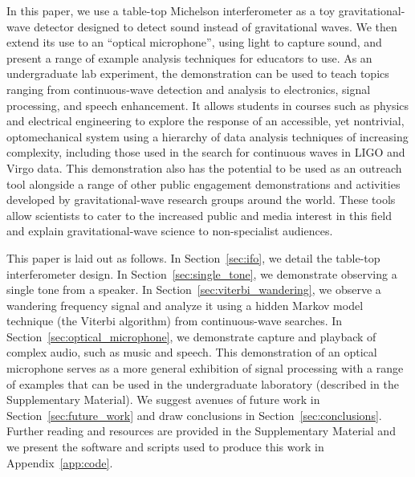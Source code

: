 \documentclass[paper-main.tex]{subfiles}
\begin{document}
In this paper, we use a table-top Michelson interferometer as a toy gravitational-wave detector designed to detect sound instead of gravitational waves. 
We then extend its use to an ``optical microphone'', using light to capture sound, and present a range of example analysis techniques for educators to use. 
As an undergraduate lab experiment, the demonstration can be used to teach topics ranging from continuous-wave detection and analysis to electronics, signal processing, and speech enhancement.
It allows students in courses such as physics and electrical engineering to explore the response of an accessible, yet nontrivial, optomechanical system using a hierarchy of data analysis techniques of increasing complexity, including those used in the search for continuous waves in LIGO and Virgo data.\cite{SuvorovaEtAl:2017, ScoX1O2Viterbi:2019} 
This demonstration also has the potential to be used as an outreach tool alongside a range of other public engagement demonstrations and activities developed by gravitational-wave research groups around the world. 
These tools allow scientists to cater to the increased public and media interest in this field and explain gravitational-wave science to non-specialist audiences.


This paper is laid out as follows. 
In Section~\ref{sec:ifo}, we detail the table-top interferometer design. 
In Section~\ref{sec:single_tone}, we demonstrate observing a single tone from a speaker. 
In Section~\ref{sec:viterbi_wandering}, we observe a wandering frequency signal and analyze it using a hidden Markov model technique (the Viterbi algorithm) from continuous-wave searches. 
In Section~\ref{sec:optical_microphone}, we demonstrate capture and playback of complex audio, such as music and speech.
This demonstration of an optical microphone serves as a more general exhibition of signal processing with a range of examples that can be used in the undergraduate laboratory (described in the Supplementary Material).
We suggest avenues of future work in Section~\ref{sec:future_work} and draw conclusions in Section~\ref{sec:conclusions}. 
Further reading and resources are provided in the Supplementary Material and we present the software and scripts used to produce this work in Appendix~\ref{app:code}.
\end{document}
